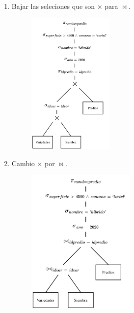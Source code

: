 \documentclass{templateNote}
\begin{document}
\begin{enumerate}
\begin{itemize}
\begin{enumerate}
            \item Bajar las seleciones que son $\times$ para $\Join$.
            \begin{figure}[H]
                \centering
                \includegraphics[width=0.4\textwidth]{img/E2-Paso-3.png}
            \end{figure}

            \newpage
            \item Cambio $\times$ por $\Join$.
            \begin{figure}[H]
                \centering
                \includegraphics[width=0.5\textwidth]{img/E2-Paso-4.png}
            \end{figure}


\end{enumerate}
\end{itemize}
\end{enumerate}
\end{document}
